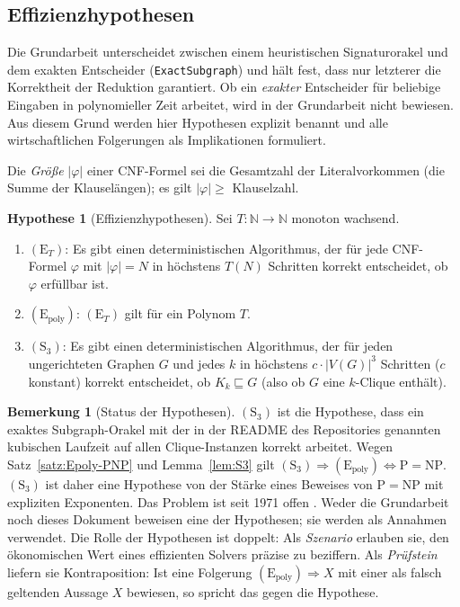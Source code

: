 \documentclass[a4paper,12pt]{article}
\theoremstyle{definition}
\newtheorem{bemerkung}[definition]{Bemerkung}
\newtheorem{hypothese}[definition]{Hypothese}
\newcommand{\NN}{\mathbb{N}}
\newcommand{\cP}{\ensuremath{\mathrm{P}}}
\newcommand{\cNP}{\ensuremath{\mathrm{NP}}}
\newcommand{\Epoly}{(\mathrm{E}_{\mathrm{poly}})}
\newcommand{\ET}{(\mathrm{E}_{T})}
\newcommand{\Sdrei}{(\mathrm{S}_{3})}
\begin{document}
\subsection{Effizienzhypothesen}
Die Grundarbeit unterscheidet zwischen einem heuristischen Signaturorakel und dem exakten Entscheider (\texttt{ExactSubgraph}) und hält fest, dass nur letzterer die Korrektheit der Reduktion garantiert. Ob ein \emph{exakter} Entscheider für beliebige Eingaben in polynomieller Zeit arbeitet, wird in der Grundarbeit nicht bewiesen. Aus diesem Grund werden hier Hypothesen explizit benannt und alle wirtschaftlichen Folgerungen als Implikationen formuliert.

Die \emph{Größe} \(|\varphi|\) einer CNF-Formel sei die Gesamtzahl der Literalvorkommen (die Summe der Klauselängen); es gilt \(|\varphi|\ge\) Klauselzahl.

\begin{hypothese}[Effizienzhypothesen]\label{hyp:E}
Sei \(T:\NN\to\NN\) monoton wachsend.
\begin{enumerate}[label=(\alph*)]
  \item \(\ET\): Es gibt einen deterministischen Algorithmus, der für jede CNF-Formel \(\varphi\) mit \(|\varphi|=N\) in höchstens \(T(N)\) Schritten korrekt entscheidet, ob \(\varphi\) erfüllbar ist.
  \item \(\Epoly\): \(\ET\) gilt für ein Polynom \(T\).
  \item \(\Sdrei\): Es gibt einen deterministischen Algorithmus, der für jeden ungerichteten Graphen \(G\) und jedes \(k\) in höchstens \(c\cdot|V(G)|^3\) Schritten (\(c\) konstant) korrekt entscheidet, ob \(K_k\sqsubseteq G\) (also ob \(G\) eine \(k\)-Clique enthält).
\end{enumerate}
\end{hypothese}

\begin{bemerkung}[Status der Hypothesen]\label{bem:status}
\(\Sdrei\) ist die Hypothese, dass ein exaktes Subgraph-Orakel mit der in der README des Repositories genannten kubischen Laufzeit auf allen Clique-Instanzen korrekt arbeitet. Wegen Satz~\ref{satz:Epoly-PNP} und Lemma~\ref{lem:S3} gilt \(\Sdrei\Rightarrow\Epoly\Leftrightarrow\cP=\cNP\). \(\Sdrei\) ist daher eine Hypothese von der Stärke eines Beweises von \(\cP=\cNP\) mit expliziten Exponenten. Das Problem ist seit 1971 offen \cite{cook,fortnow2009,aaronson2016}. Weder die Grundarbeit noch dieses Dokument beweisen eine der Hypothesen; sie werden als Annahmen verwendet. Die Rolle der Hypothesen ist doppelt: Als \emph{Szenario} erlauben sie, den ökonomischen Wert eines effizienten Solvers präzise zu beziffern. Als \emph{Prüfstein} liefern sie Kontraposition: Ist eine Folgerung \(\Epoly\Rightarrow X\) mit einer als falsch geltenden Aussage \(X\) bewiesen, so spricht das gegen die Hypothese.
\end{bemerkung}
\end{document}
